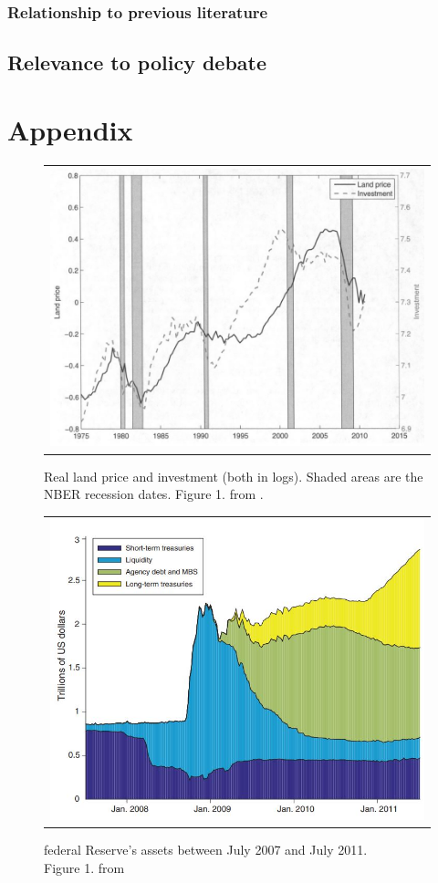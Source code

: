 \documentclass{amsart}
\theoremstyle{definition}
\theoremstyle{remark}
\numberwithin{equation}{section}
\begin{document}
\subsubsection{Relationship to previous literature}

\subsection*{Relevance to policy debate}

\newpage




\newpage

\section*{Appendix}

\begin{figure}[h!]
    \centering
    \begin{tabular}{c}
        \includegraphics[width=0.8 \textwidth]{landpriceinvestment.JPG}
    \end{tabular}
    \caption{Real land price and investment (both in logs). Shaded areas are the NBER recession dates. Figure 1. from \cite{liu2013land}.}
    \label{fig:landpriceinvestment}
\end{figure}

\begin{figure}[h!]
    \centering
    \begin{tabular}{c}
        \includegraphics[width=0.8 \textwidth]{fedsheet.JPG}
    \end{tabular}
    \caption{federal Reserve's assets between July 2007 and July 2011.\\ Figure 1. from \cite{del2017great}}
    \label{fig:fedsheet}
\end{figure}
\end{document}

